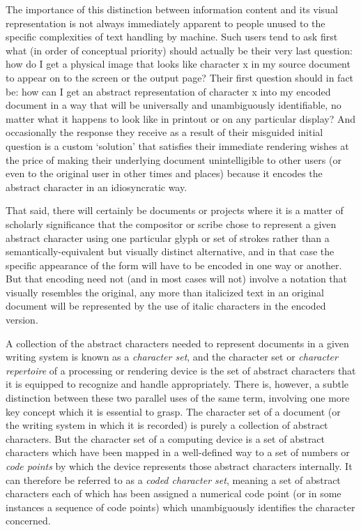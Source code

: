 The importance of this distinction between information content and its visual representation is not always immediately apparent to people unused to the specific complexities of text handling by machine. Such users tend to ask first what (in order of conceptual priority) should actually be their very last question: how do I get a physical image that looks like character x in my source document to appear on to the screen or the output page? Their first question should in fact be: how can I get an abstract representation of character x into my encoded document in a way that will be universally and unambiguously identifiable, no matter what it happens to look like in printout or on any particular display? And occasionally the response they receive as a result of their misguided initial question is a custom ‘solution’ that satisfies their immediate rendering wishes at the price of making their underlying document unintelligible to other users (or even to the original user in other times and places) because it encodes the abstract character in an idiosyncratic way.\par
That said, there will certainly be documents or projects where it is a matter of scholarly significance that the compositor or scribe chose to represent a given abstract character using one particular glyph or set of strokes rather than a semantically-equivalent but visually distinct alternative, and in that case the specific appearance of the form will have to be encoded in one way or another. But that encoding need not (and in most cases will not) involve a notation that visually resembles the original, any more than italicized text in an original document will be represented by the use of italic characters in the encoded version.\par
A collection of the abstract characters needed to represent documents in a given writing system is known as a \textit{character set}, and the character set or \textit{character repertoire} of a processing or rendering device is the set of abstract characters that it is equipped to recognize and handle appropriately. There is, however, a subtle distinction between these two parallel uses of the same term, involving one more key concept which it is essential to grasp. The character set of a document (or the writing system in which it is recorded) is purely a collection of abstract characters. But the character set of a computing device is a set of abstract characters which have been mapped in a well-defined way to a set of numbers or \textit{code points} by which the device represents those abstract characters internally. It can therefore be referred to as a \textit{coded character set}, meaning a set of abstract characters each of which has been assigned a numerical code point (or in some instances a sequence of code points) which unambiguously identifies the character concerned.\par
